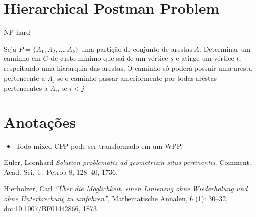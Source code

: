 \documentclass{article}
\begin{document}
	\section{Hierarchical Postman Problem}

	NP-hard 

	Seja $P = \{A_1, A_2, \dots, A_k\}$ uma partição do conjunto de arestas $A$. Determinar um caminho em $G$ de custo mínimo que sai de um vértice $s$ e atinge um vértice $t$, respeitando uma hierarquia das arestas. O caminho só poderá possuir uma aresta pertencente a $A_j$ se o caminho passar anteriormente por todas arestas pertencentes a $A_i$, se $i < j$.


	\section{Anotações}

	\begin{itemize}
		\item Todo mixed CPP pode ser transformado em um WPP.
	\end{itemize}

	\medskip

	\begin{thebibliography}{9}
	Euler, Leonhard
	\textit{Solution problematis ad geometriam situs pertinentis}. 
	Comment. Acad. Sci. U. Petrop 8, 128–40, 1736.

	Hierholzer, Carl
	\textit{``Über die Möglichkeit, einen Linienzug ohne Wiederholung und ohne Unterbrechung zu umfahren''}, 
	Mathematische Annalen, 6 (1): 30–32, doi:10.1007/BF01442866, 1873.
	\end{thebibliography}
 
\end{document}
